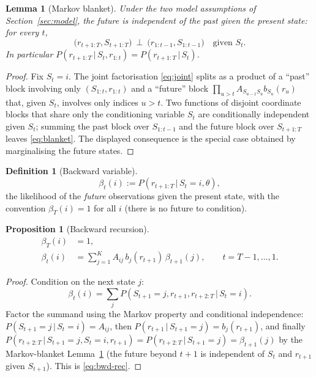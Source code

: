 \documentclass[11pt]{article}
\newcommand{\given}{\,\vert\,}
\newcommand{\eqdef}{:=}
\newcommand{\state}{S}
\newcommand{\obs}{r}
\newcommand{\nstate}{K}
\newcommand{\bwd}{\beta}
\theoremstyle{plain}
\newtheorem{proposition}{Proposition}
\newtheorem{lemma}{Lemma}
\theoremstyle{definition}
\newtheorem{definition}{Definition}
\theoremstyle{remark}
\begin{document}
\begin{lemma}[Markov blanket]\label{lem:blanket}
Under the two model assumptions of Section~\ref{sec:model}, the future is
independent of the past given the present state: for every $t$,
\begin{equation}\label{eq:blanket}
  \big(\obs_{t+1:T},\state_{t+1:T}\big) \ \perp\ \big(\obs_{1:t-1},\state_{1:t-1}\big)
  \quad\text{given } \state_t .
\end{equation}
In particular $P(\obs_{t+1:T}\given\state_t,\obs_{1:t})=P(\obs_{t+1:T}\given\state_t)$.
\end{lemma}

\begin{proof}
Fix $\state_t=i$. The joint factorisation \eqref{eq:joint} splits as a product
of a ``past'' block involving only $(\state_{1:t},\obs_{1:t})$ and a ``future''
block $\prod_{u>t} A_{\state_{u-1}\state_u} b_{\state_u}(\obs_u)$ that, given
$\state_t$, involves only indices $u>t$. Two functions of disjoint coordinate
blocks that share only the conditioning variable $\state_t$ are conditionally
independent given $\state_t$; summing the past block over $\state_{1:t-1}$ and
the future block over $\state_{t+1:T}$ leaves \eqref{eq:blanket}. The displayed
consequence is the special case obtained by marginalising the future states.
\end{proof}

\begin{definition}[Backward variable]
\begin{equation}
  \bwd_t(i) \eqdef P(\obs_{t+1:T}\given \state_t=i,\theta),
\end{equation}
the likelihood of the \emph{future} observations given the present state, with
the convention $\bwd_T(i)=1$ for all $i$ (there is no future to condition).
\end{definition}

\begin{proposition}[Backward recursion]\label{prop:bwd}
\begin{align}
  \bwd_T(i) &= 1, \\
  \bwd_t(i) &= \sum_{j=1}^{\nstate} A_{ij}\, b_j(\obs_{t+1})\, \bwd_{t+1}(j),
              \qquad t=T-1,\dots,1.\label{eq:bwd-rec}
\end{align}
\end{proposition}

\begin{proof}
Condition on the next state $j$:
\[
  \bwd_t(i) = \sum_j P(\state_{t+1}=j,\obs_{t+1},\obs_{t+2:T}\given\state_t=i).
\]
Factor the summand using the Markov property and conditional independence:
$P(\state_{t+1}=j\given\state_t=i)=A_{ij}$, then
$P(\obs_{t+1}\given\state_{t+1}=j)=b_j(\obs_{t+1})$, and finally
$P(\obs_{t+2:T}\given\state_{t+1}=j,\state_t=i,\obs_{t+1})
=P(\obs_{t+2:T}\given\state_{t+1}=j)=\bwd_{t+1}(j)$ by the Markov-blanket
Lemma~\ref{lem:blanket} (the future beyond $t+1$ is independent of $\state_t$ and
$\obs_{t+1}$ given $\state_{t+1}$). This is \eqref{eq:bwd-rec}.
\end{proof}
\end{document}
